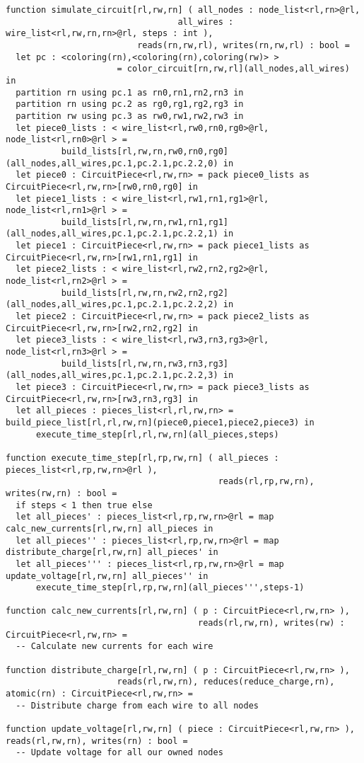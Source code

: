 \begin{lstlisting}[float={t},label={lst:code_ex},caption={Circuit simulation.}]
function simulate_circuit[rl,rw,rn] ( all_nodes : node_list<rl,rn>@rl,
                                  all_wires : wire_list<rl,rw,rn,rn>@rl, steps : int ),
                          reads(rn,rw,rl), writes(rn,rw,rl) : bool = 
  let pc : <coloring(rn),<coloring(rn),coloring(rw)> >
                      = color_circuit[rn,rw,rl](all_nodes,all_wires) in
  partition rn using pc.1 as rn0,rn1,rn2,rn3 in
  partition rn using pc.2 as rg0,rg1,rg2,rg3 in
  partition rw using pc.3 as rw0,rw1,rw2,rw3 in
  let piece0_lists : < wire_list<rl,rw0,rn0,rg0>@rl, node_list<rl,rn0>@rl > = 
           build_lists[rl,rw,rn,rw0,rn0,rg0](all_nodes,all_wires,pc.1,pc.2.1,pc.2.2,0) in
  let piece0 : CircuitPiece<rl,rw,rn> = pack piece0_lists as CircuitPiece<rl,rw,rn>[rw0,rn0,rg0] in
  let piece1_lists : < wire_list<rl,rw1,rn1,rg1>@rl, node_list<rl,rn1>@rl > = 
           build_lists[rl,rw,rn,rw1,rn1,rg1](all_nodes,all_wires,pc.1,pc.2.1,pc.2.2,1) in
  let piece1 : CircuitPiece<rl,rw,rn> = pack piece1_lists as CircuitPiece<rl,rw,rn>[rw1,rn1,rg1] in
  let piece2_lists : < wire_list<rl,rw2,rn2,rg2>@rl, node_list<rl,rn2>@rl > = 
           build_lists[rl,rw,rn,rw2,rn2,rg2](all_nodes,all_wires,pc.1,pc.2.1,pc.2.2,2) in
  let piece2 : CircuitPiece<rl,rw,rn> = pack piece2_lists as CircuitPiece<rl,rw,rn>[rw2,rn2,rg2] in
  let piece3_lists : < wire_list<rl,rw3,rn3,rg3>@rl, node_list<rl,rn3>@rl > = 
           build_lists[rl,rw,rn,rw3,rn3,rg3](all_nodes,all_wires,pc.1,pc.2.1,pc.2.2,3) in
  let piece3 : CircuitPiece<rl,rw,rn> = pack piece3_lists as CircuitPiece<rl,rw,rn>[rw3,rn3,rg3] in
  let all_pieces : pieces_list<rl,rl,rw,rn> = build_piece_list[rl,rl,rw,rn](piece0,piece1,piece2,piece3) in
      execute_time_step[rl,rl,rw,rn](all_pieces,steps)

function execute_time_step[rl,rp,rw,rn] ( all_pieces : pieces_list<rl,rp,rw,rn>@rl ),
                                          reads(rl,rp,rw,rn), writes(rw,rn) : bool =
  if steps < 1 then true else
  let all_pieces' : pieces_list<rl,rp,rw,rn>@rl = map calc_new_currents[rl,rw,rn] all_pieces in
  let all_pieces'' : pieces_list<rl,rp,rw,rn>@rl = map distribute_charge[rl,rw,rn] all_pieces' in
  let all_pieces''' : pieces_list<rl,rp,rw,rn>@rl = map update_voltage[rl,rw,rn] all_pieces'' in
      execute_time_step[rl,rp,rw,rn](all_pieces''',steps-1)

function calc_new_currents[rl,rw,rn] ( p : CircuitPiece<rl,rw,rn> ), 
                                      reads(rl,rw,rn), writes(rw) : CircuitPiece<rl,rw,rn> =
  -- Calculate new currents for each wire

function distribute_charge[rl,rw,rn] ( p : CircuitPiece<rl,rw,rn> ), 
                      reads(rl,rw,rn), reduces(reduce_charge,rn), atomic(rn) : CircuitPiece<rl,rw,rn> =
  -- Distribute charge from each wire to all nodes

function update_voltage[rl,rw,rn] ( piece : CircuitPiece<rl,rw,rn> ), reads(rl,rw,rn), writes(rn) : bool = 
  -- Update voltage for all our owned nodes

\end{lstlisting}

